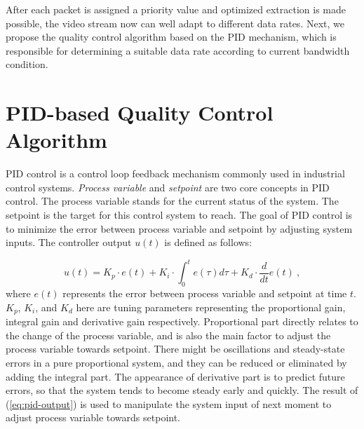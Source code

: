 \documentclass[journal]{IEEEtran}
\begin{document}
After each packet is assigned a priority value and optimized extraction is made possible, the video stream now can well adapt to different data rates. Next, we propose the quality control algorithm based on the PID mechanism, which is responsible for determining a suitable data rate according to current bandwidth condition.

\section{PID-based Quality Control Algorithm}
\label{sec:quality-control}

PID control \cite{PID}\cite{Astrom02} is a control loop feedback mechanism commonly used in industrial control systems. \textit{Process variable} and \textit{setpoint} are two core concepts in PID control. The process variable stands for the current status of the system. The setpoint is the target for this control system to reach. The goal of PID control is to minimize the error between process variable and setpoint by adjusting system inputs. The controller output $u(t)$ is defined as follows:

\begin{equation}
\label{eq:pid-output}
u(t) = {K_p} \cdot e(t) + {K_i} \cdot \int_0^t {e(\tau )d\tau }  + {K_d} \cdot \frac{d}{{dt}}e(t) \: ,
\end{equation}
where $e(t)$ represents the error between process variable and setpoint at time $t$. $K_p$, $K_i$, and $K_d$ here are tuning parameters representing the proportional gain, integral gain and derivative gain respectively. Proportional part directly relates to the change of the process variable, and is also the main factor to adjust the process variable towards setpoint. There might be oscillations and steady-state errors in a pure proportional system, and they can be reduced or eliminated by adding the integral part. The appearance of derivative part is to predict future errors, so that the system tends to become steady early and quickly. The result of (\ref{eq:pid-output}) is used to manipulate the system input of next moment to adjust process variable towards setpoint.
\end{document}
